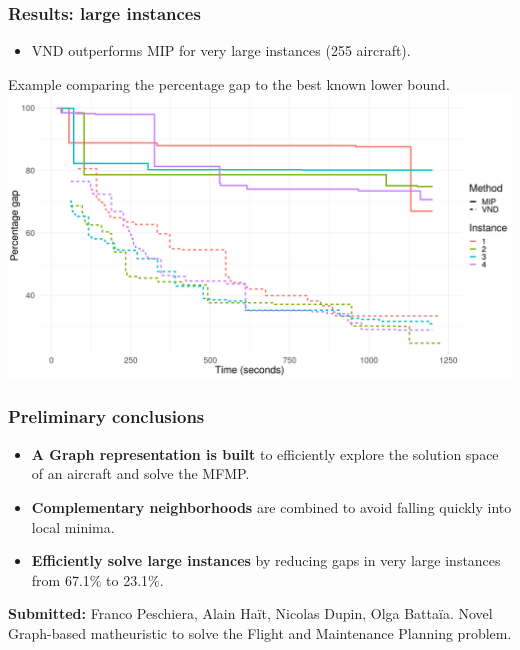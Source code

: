 \begin{frame}
\frametitle{\textbf{Results: large instances}}
  \begin{itemize}
    \item VND outperforms MIP for very large instances (255 aircraft).
  \end{itemize}

  \begin{block}{}
    Example comparing the percentage gap to the best known lower bound.
    \includegraphics[width=\linewidth]{images/progress_gaps_very_large_255.png}  
  \end{block}{}
\end{frame}

\begin{frame}[t]
\frametitle{\textbf{Preliminary conclusions}}
  \pause
    \begin{itemize}[<+->]
    \item \textbf{A Graph representation is built} 
      to efficiently explore the solution space of an aircraft and solve the MFMP.
    \item \textbf{Complementary neighborhoods} 
      are combined to avoid falling quickly into local minima.
    \item \textbf{Efficiently solve large instances} 
      by reducing gaps in very large instances from 67.1\% to 23.1\%.
    \end{itemize}
  \pause
  \textbf{Submitted:} Franco Peschiera, Alain Haït, Nicolas Dupin, Olga Battaïa. Novel Graph-based matheuristic to solve the Flight and Maintenance Planning problem.
\end{frame}

